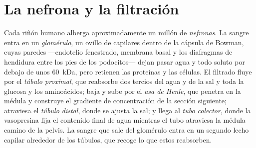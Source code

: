 \section{La nefrona y la filtración}

\begin{definition}[La nefrona]\label{def:b3:renal-osmoregulation:nephron}
Cada riñón humano alberga aproximadamente un millón de \emph{nefronas}.
La sangre entra en un \emph{glomérulo}, un ovillo de capilares dentro
de la cápsula de Bowman, cuyas paredes ---endotelio fenestrado,
membrana basal y los diafragmas de hendidura entre los pies de los
podocitos--- dejan pasar agua y todo soluto por debajo de unos
\qty{60}{kDa}, pero retienen las proteínas y las células. El filtrado
fluye por el \emph{túbulo proximal}, que reabsorbe dos tercios del agua
y de la sal y toda la glucosa y los aminoácidos; baja y sube por el
\emph{asa de Henle}, que penetra en la médula y construye el gradiente
de concentración de la sección siguiente; atraviesa el \emph{túbulo
distal}, donde se ajusta la sal; y llega al \emph{tubo colector}, donde
la vasopresina fija el contenido final de agua mientras el tubo
atraviesa la médula camino de la pelvis. La sangre que sale del
glomérulo entra en un segundo lecho capilar alrededor de los túbulos,
que recoge lo que estos reabsorben.
\end{definition}

